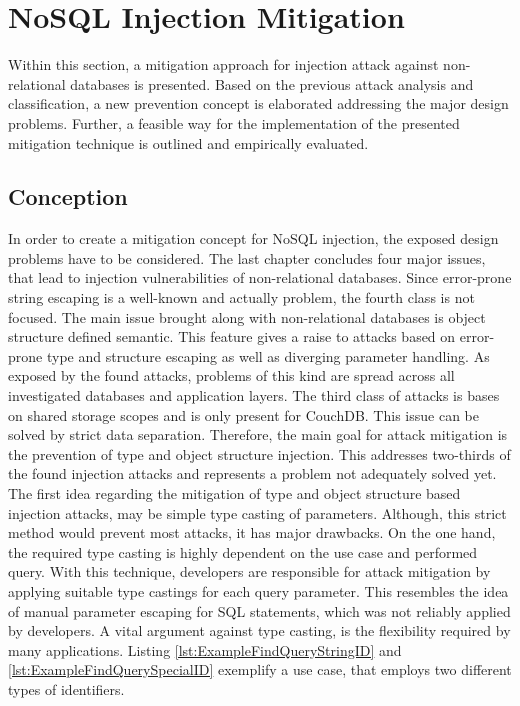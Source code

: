 \chapter{NoSQL Injection Mitigation}
Within this section, a mitigation approach for injection attack against non-relational databases is presented. Based on the previous attack analysis and classification, a new prevention concept is elaborated addressing the major design problems. Further, a feasible way for the implementation of the presented mitigation technique is outlined and empirically evaluated.

\section{Conception}
In order to create a mitigation concept for NoSQL injection, the exposed design problems have to be considered. The last chapter concludes four major issues, that lead to injection vulnerabilities of non-relational databases. Since error-prone string escaping is a well-known and actually problem, the fourth class is not focused. The main issue brought along with non-relational databases is object structure defined semantic. This feature gives a raise to attacks based on error-prone type and structure escaping as well as diverging parameter handling. As exposed by the found attacks, problems of this kind are spread across all investigated databases and application layers. The third class of attacks is bases on shared storage scopes and is only present for CouchDB. This issue can be solved by strict data separation. Therefore, the main goal for attack mitigation is the prevention of type and object structure injection. This addresses two-thirds of the found injection attacks and represents a problem not adequately solved yet. \\

The first idea regarding the mitigation of type and object structure based injection attacks, may be simple type casting of parameters. Although, this strict method would prevent most attacks, it has major drawbacks. On the one hand, the required type casting is highly dependent on the use case and performed query. With this technique, developers are responsible for attack mitigation by applying suitable type castings for each query parameter. This resembles the idea of manual parameter escaping for SQL statements, which was not reliably applied by developers. A vital argument against type casting, is the flexibility required by many applications. Listing \ref{lst:ExampleFindQueryStringID} and \ref{lst:ExampleFindQuerySpecialID} exemplify a use case, that employs two different types of identifiers. \\

